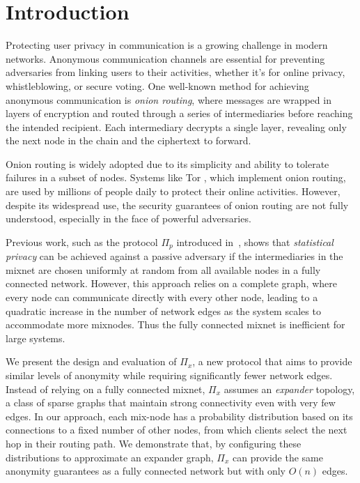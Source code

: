 \section{Introduction}

Protecting user privacy in communication is a growing challenge in modern networks. Anonymous communication channels are essential for preventing adversaries from linking users to their activities, whether it's for online privacy, whistleblowing, or secure voting. One well-known method for achieving anonymous communication is \textit{onion routing}, where messages are wrapped in layers of encryption and routed through a series of intermediaries before reaching the intended recipient. Each intermediary decrypts a single layer, revealing only the next node in the chain and the ciphertext to forward. 

Onion routing is widely adopted due to its simplicity and ability to tolerate failures in a subset of nodes. Systems like Tor \cite{tor}, which implement onion routing, are used by millions of people daily to protect their online activities. However, despite its widespread use, the security guarantees of onion routing are not fully understood, especially in the face of powerful adversaries.

Previous work, such as the protocol $\Pi_p$ introduced in~\cite{ICALP:AndLysUpf18}, shows that \textit{statistical privacy} can be achieved against a passive adversary if the intermediaries in the mixnet are chosen uniformly at random from all available nodes in a fully connected network. However, this approach relies on a complete graph, where every node can communicate directly with every other node, leading to a quadratic increase in the number of network edges as the system scales to accommodate more mixnodes. Thus the fully connected mixnet is inefficient for large systems.

We present the design and evaluation of $\Pi_x$, a new protocol that aims to provide similar levels of anonymity while requiring significantly fewer network edges. Instead of relying on a fully connected mixnet, $\Pi_x$ assumes an \textit{expander} topology, a class of sparse graphs that maintain strong connectivity even with very few edges. In our approach, each mix-node has a probability distribution based on its connections to a fixed number of other nodes, from which clients select the next hop in their routing path. We demonstrate that, by configuring these distributions to approximate an expander graph, $\Pi_x$ can provide the same anonymity guarantees as a fully connected network but with only $O(n)$ edges.

